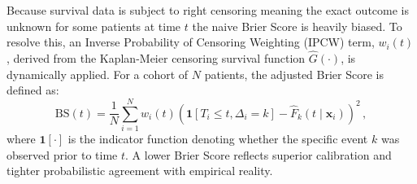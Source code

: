 \documentclass[a4paper,twoside,12pt]{report}
\begin{document}
Because survival data is subject to right censoring meaning the exact outcome is unknown for some patients at time $t$ the naive Brier Score is heavily biased. To resolve this, an Inverse Probability of Censoring Weighting (IPCW) term, $w_i(t)$, derived from the Kaplan-Meier censoring survival function $\hat{G}(\cdot)$, is dynamically applied. For a cohort of $N$ patients, the adjusted Brier Score is defined as:
$$\text{BS}(t) = \frac{1}{N} \sum_{i=1}^N w_i(t) \left( \mathbf{1}[T_i \le t, \Delta_i = k] - \hat{F}_k(t \mid \mathbf{x}_i) \right)^2 \,,$$
where $\mathbf{1}[\cdot]$ is the indicator function denoting whether the specific event $k$ was observed prior to time $t$. A lower Brier Score reflects superior calibration and tighter probabilistic agreement with empirical reality.



\end{document}
